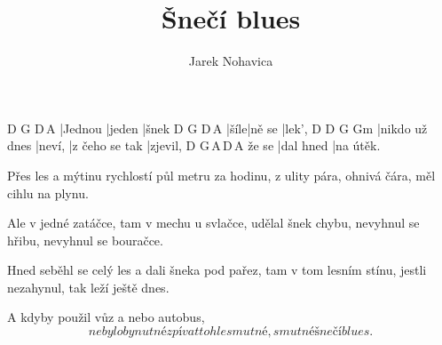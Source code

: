 \documentclass{song}
\title{Šnečí blues}
\author{Jarek Nohavica}
\begin{document}
\strophe
D       G\7    D\,A\7
|Jednou |jeden |šnek
D    G      D\,A\7
|šíle|ně se |lek',
D              D\7    G              Gm
|nikdo už dnes |neví, |z čeho se tak |zjevil,
      D         G\7\,A\7\,D\,A\7
že se |dal hned |na útěk.
\endstrophe

\strophe*
Přes les a mýtinu
rychlostí půl metru za hodinu,
z ulity pára, ohnivá čára,
měl cihlu na plynu.
\endstrophe

\strophe*
Ale v jedné zatáčce,
tam v mechu u svlačce,
udělal šnek chybu, nevyhnul se hřibu,
nevyhnul se bouračce.
\endstrophe

\strophe*
Hned seběhl se celý les
a dali šneka pod pařez,
tam v tom lesním stínu, jestli nezahynul,
tak leží ještě dnes.
\endstrophe

\strophe*
A kdyby použil vůz
a nebo autobus,
\[ nebylo by nutné zpívat tohle smutné,
smutné šnečí blues. \]
\endstrophe
\end{document}

